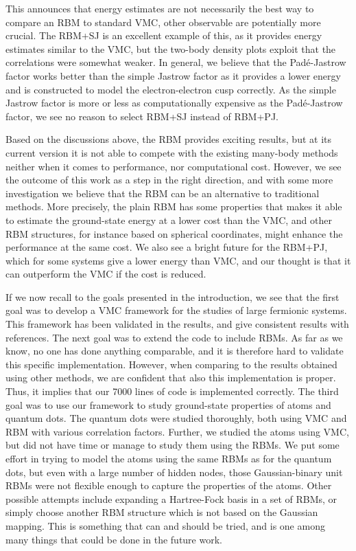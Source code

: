 This announces that energy estimates are not necessarily the best way to compare an RBM to standard VMC, other observable are potentially more crucial. The RBM+SJ is an excellent example of this, as it provides energy estimates similar to the VMC, but the two-body density plots exploit that the correlations were somewhat weaker. In general, we believe that the Padé-Jastrow factor works better than the simple Jastrow factor as it provides a lower energy and is constructed to model the electron-electron cusp correctly. As the simple Jastrow factor is more or less as computationally expensive as the Padé-Jastrow factor, we see no reason to select RBM+SJ instead of RBM+PJ.

Based on the discussions above, the RBM provides exciting results, but at its current version it is not able to compete with the existing many-body methods neither when it comes to performance, nor computational cost. However, we see the outcome of this work as a step in the right direction, and with some more investigation we believe that the RBM can be an alternative to traditional methods. More precisely, the plain RBM has some properties that makes it able to estimate the ground-state energy at a lower cost than the VMC, and other RBM structures, for instance based on spherical coordinates, might enhance the performance at the same cost. We also see a bright future for the RBM+PJ, which for some systems give a lower energy than VMC, and our thought is that it can outperform the VMC if the cost is reduced.

If we now recall to the goals presented in the introduction, we see that the first goal was to develop a VMC framework for the studies of large fermionic systems. This framework has been validated in the results, and give consistent results with references. The next goal was to extend the code to include RBMs. As far as we know, no one has done anything comparable, and it is therefore hard to validate this specific implementation. However, when comparing to the results obtained using other methods, we are confident that also this implementation is proper. Thus, it implies that our 7000 lines of code is implemented correctly. The third goal was to use our framework to study ground-state properties of atoms and quantum dots. The quantum dots were studied thoroughly, both using VMC and RBM with various correlation factors. Further, we studied the atoms using VMC, but did not have time or manage to study them using the RBMs. We put some effort in trying to model the atoms using the same RBMs as for the quantum dots, but even with a large number of hidden nodes, those Gaussian-binary unit RBMs were not flexible enough to capture the properties of the atoms. Other possible attempts include expanding a Hartree-Fock basis in a set of RBMs, or simply choose another RBM structure which is not based on the Gaussian mapping. This is something that can and should be tried, and is one among many things that could be done in the future work. 

